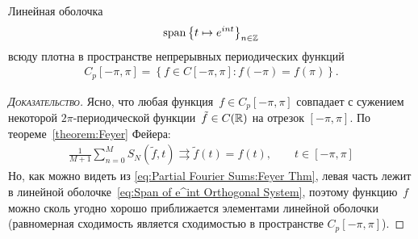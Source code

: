 \documentclass[../complex-analysis.tex]{subfiles}
\begin{document}
\begin{crly}
 \label{corollary:e^int System Density in Periodic Continuous Funcs}
 Линейная оболочка
 \begin{align}
  \label{eq:Span of e^int Orthogonal System}
  \mathrm{span} \left\{ t \mapsto e^{int} \right\}_{n \in \mathbb{Z}}
 \end{align} всюду плотна в пространстве непрерывных периодических функций
 \begin{align*}
  C_p[-\pi,\pi] = \left\{ f \in C[-\pi,\pi] : f(-\pi) = f(\pi) \right\}.
 \end{align*}
\end{crly}
\begin{proof}[\normalfont\textsc{Доказательство}]
 Ясно, что любая функция~$ f \in C_p [-\pi,\pi] $ совпадает с сужением некоторой $ 2\pi $-периодической функции~$ \tilde f \in C(\mathbb{R}) $ на отрезок $ [-\pi,\pi] $. По теореме~\ref{theorem:Feyer} Фейера:
 \begin{align*}
  \frac{1}{M+1} \sum_{n=0}^{M} S_N(\tilde f, t) \rightrightarrows \tilde f(t) = f(t), \qquad t \in [-\pi,\pi]
 \end{align*} Но, как можно видеть из \eqref{eq:Partial Fourier Sums:Feyer Thm}, левая часть лежит в линейной оболочке~\eqref{eq:Span of e^int Orthogonal System}, поэтому функцию~$ f $ можно сколь угодно хорошо приближается элементами линейной оболочки (равномерная сходимость является сходимостью в пространстве $ C_p [-\pi,\pi] $).
\end{proof}
\end{document}
